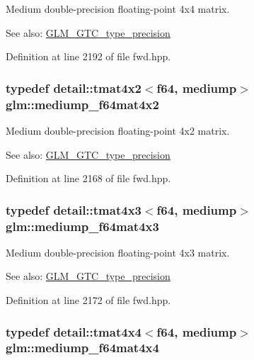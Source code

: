 Medium double-precision floating-point 4x4 matrix. \begin{Desc}
\item[See also:]\hyperlink{group__gtc__type__precision}{GLM\_\-GTC\_\-type\_\-precision} \end{Desc}


Definition at line 2192 of file fwd.hpp.\hypertarget{group__gtc__type__precision_g4a7a2b6889f08c9209a4f994fd87cc4e}{
\subsubsection[mediump\_\-f64mat4x2]{\setlength{\rightskip}{0pt plus 5cm}typedef detail::tmat4x2$<$f64, mediump$>$ {\bf glm::mediump\_\-f64mat4x2}}}
\label{group__gtc__type__precision_g4a7a2b6889f08c9209a4f994fd87cc4e}


Medium double-precision floating-point 4x2 matrix. \begin{Desc}
\item[See also:]\hyperlink{group__gtc__type__precision}{GLM\_\-GTC\_\-type\_\-precision} \end{Desc}


Definition at line 2168 of file fwd.hpp.\hypertarget{group__gtc__type__precision_g4a920abfb082b0ffd8d89614cb787021}{
\subsubsection[mediump\_\-f64mat4x3]{\setlength{\rightskip}{0pt plus 5cm}typedef detail::tmat4x3$<$f64, mediump$>$ {\bf glm::mediump\_\-f64mat4x3}}}
\label{group__gtc__type__precision_g4a920abfb082b0ffd8d89614cb787021}


Medium double-precision floating-point 4x3 matrix. \begin{Desc}
\item[See also:]\hyperlink{group__gtc__type__precision}{GLM\_\-GTC\_\-type\_\-precision} \end{Desc}


Definition at line 2172 of file fwd.hpp.\hypertarget{group__gtc__type__precision_g941e42a0b337b5c8ad9c324aaa6b2ad5}{
\subsubsection[mediump\_\-f64mat4x4]{\setlength{\rightskip}{0pt plus 5cm}typedef detail::tmat4x4$<$f64, mediump$>$ {\bf glm::mediump\_\-f64mat4x4}}}
\label{group__gtc__type__precision_g941e42a0b337b5c8ad9c324aaa6b2ad5}


